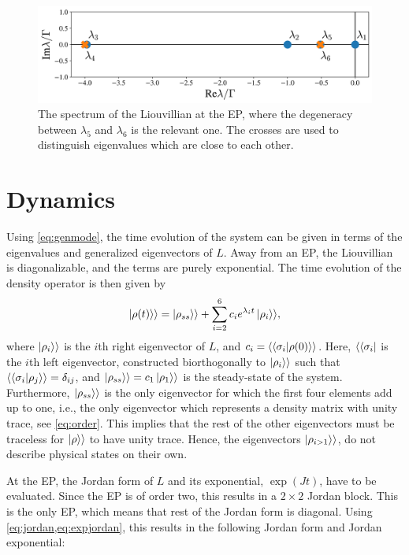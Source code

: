 \documentclass[../main.tex]{subfiles}
\begin{document}
\begin{figure}[H]
    \centering
    \includegraphics[width=0.8\linewidth]{figures/spectrum.png}
    \caption{The spectrum of the Liouvillian at the EP, where the degeneracy between $\lambda_5$ and $\lambda_6$ is the relevant one. The crosses are used to distinguish eigenvalues which are close to each other.}
    \label{fig:spec}
\end{figure}

\section{Dynamics}

Using \cref{eq:genmode}, the time evolution of the system can be given in terms of the eigenvalues and generalized eigenvectors of $L$. Away from an EP, the Liouvillian is diagonalizable, and the terms are purely exponential. The time evolution of the density operator is then given by
\begin{equation}\label{eq:dynnonep}
    \ket{\rho(t)}\rangle = \ket{\rho_{ss}}\rangle + \sum_{i=2}^6 c_i e^{\lambda_i t} \ket{\rho_i}\rangle,
\end{equation}
where $\ket{\rho_i}\rangle$ is the $i$th right eigenvector of $L$, and $c_i = \langle\braket{\sigma_i|\rho(0)}\rangle$. Here, $\langle\bra{\sigma_i}$ is the $i$th left eigenvector, constructed biorthogonally to $\ket{\rho_i}\rangle$ such that $\langle\braket{\sigma_i|\rho_j}\rangle = \delta_{ij}$, and $\ket{\rho_{ss}}\rangle = c_1 \ket{\rho_1}\rangle$ is the steady-state of the system. Furthermore, $\ket{\rho_{ss}}\rangle$ is the only eigenvector for which the first four elements add up to one, i.e., the only eigenvector which represents a density matrix with unity trace, see \cref{eq:order}. This implies that the rest of the other eigenvectors must be traceless for $\ket{\rho}\rangle$ to have unity trace. Hence, the eigenvectors $\ket{\rho_{i>1}}\rangle$, do not describe physical states on their own.

At the EP, the Jordan form of $L$ and its exponential, $\exp{(Jt)}$, have to be evaluated. Since the EP is of order two, this results in a $2\times2$ Jordan block. This is the only EP, which means that rest of the Jordan form is diagonal. Using \cref{eq:jordan,eq:expjordan}, this results in the following Jordan form and Jordan exponential:
\end{document}
